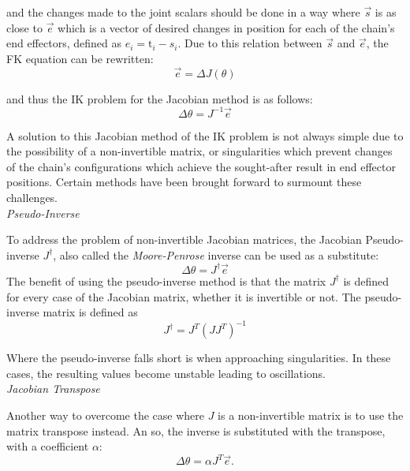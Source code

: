 and the changes made to the joint scalars should be done in a way where
\(\vec{s}\) is as close to \(\vec{e}\) which is a vector of desired changes in position
for each of the chain's end effectors, defined as \(e_i = \mbox{t}_i - s_i\).
Due to this relation between \(\vec{s}\) and \(\vec{e}\), the FK equation can
be rewritten:
\begin{equation}
    \vec{e} = \Delta J(\theta)
\end{equation}

and thus the IK problem for the Jacobian method is as follows:
\begin{equation}
    \Delta \theta = J^{-1} \vec{e}
\end{equation}

A solution to this Jacobian method of the IK problem is not always simple due to
the possibility of a non-invertible matrix, or singularities which prevent
changes of the chain's configurations which achieve the sought-after result in
end effector positions. Certain methods have been brought forward to surmount
these challenges. \\

\noindent\textit{Pseudo-Inverse}

To address the problem of non-invertible Jacobian matrices, the Jacobian
Pseudo-inverse \(J^\dagger\), also called the \textit{Moore-Penrose} inverse can be used as
a substitute:
\begin{equation}
    \Delta \theta = J^{\dagger}\vec{e}
\end{equation}
The benefit of using the pseudo-inverse method is that the matrix \(J^\dagger\)
is defined for every case of the Jacobian matrix, whether it is invertible or
not. The pseudo-inverse matrix is defined as
\begin{equation}
    J^\dagger = J^T (J J^T)^{-1}
\end{equation}

Where the pseudo-inverse falls short is when approaching singularities. In these
cases, the resulting values become unstable leading to oscillations. \\

\noindent\textit{Jacobian Transpose}

Another way to overcome the case where \(J\) is a non-invertible matrix is to
use the matrix transpose instead. An so, the inverse is substituted with the
transpose, with a coefficient \(\alpha\):
\begin{equation}
    \Delta \theta = \alpha J^T \vec{e}.
\end{equation}

